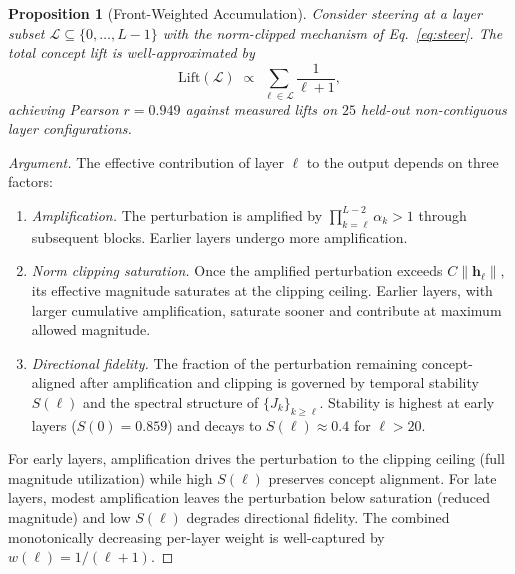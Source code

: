 \documentclass{article}
\newtheorem{proposition}[theorem]{Proposition}
\theoremstyle{definition}
\newcommand{\bh}{\mathbf{h}}
\begin{document}
\begin{proposition}[Front-Weighted Accumulation]
\label{prop:accumulation}
Consider steering at a layer subset $\mathcal{L} \subseteq \{0, \ldots, L-1\}$ with the norm-clipped mechanism of Eq.~\eqref{eq:steer}.
The total concept lift is well-approximated by
\begin{equation}
  \mathrm{Lift}(\mathcal{L}) \;\propto\; \sum_{\ell \in \mathcal{L}} \frac{1}{\ell + 1},
  \label{eq:front-weight}
\end{equation}
achieving Pearson $r = 0.949$ against measured lifts on $25$ held-out non-contiguous layer configurations.
\end{proposition}

\begin{proof}[Argument]
The effective contribution of layer $\ell$ to the output depends on three factors:
\begin{enumerate}[nosep,leftmargin=*]
  \item \emph{Amplification.} The perturbation is amplified by $\prod_{k=\ell}^{L-2} \alpha_k > 1$ through subsequent blocks. Earlier layers undergo more amplification.
  \item \emph{Norm clipping saturation.} Once the amplified perturbation exceeds $C\|\bh_\ell\|$, its effective magnitude saturates at the clipping ceiling. Earlier layers, with larger cumulative amplification, saturate sooner and contribute at maximum allowed magnitude.
  \item \emph{Directional fidelity.} The fraction of the perturbation remaining concept-aligned after amplification and clipping is governed by temporal stability $S(\ell)$ and the spectral structure of $\{J_k\}_{k \geq \ell}$. Stability is highest at early layers ($S(0) = 0.859$) and decays to $S(\ell) \approx 0.4$ for $\ell > 20$.
\end{enumerate}
For early layers, amplification drives the perturbation to the clipping ceiling (full magnitude utilization) while high $S(\ell)$ preserves concept alignment.
For late layers, modest amplification leaves the perturbation below saturation (reduced magnitude) and low $S(\ell)$ degrades directional fidelity.
The combined monotonically decreasing per-layer weight is well-captured by $w(\ell) = 1/(\ell+1)$.


\end{proof}
\end{document}
